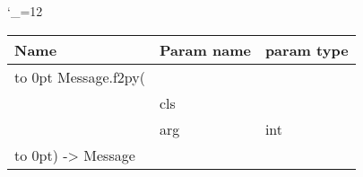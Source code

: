 \begingroup \catcode`\_=12 \tt
\begin{tabular}{lll}
\toprule
\textrm{Name}&\textrm{Param name}&\textrm{param type}\\
\midrule
\hbox to 0pt {Message.f2py(\hss}\\
& cls\\
& arg & int\\
\hbox to 0pt{) -> Message\hss}\\
\bottomrule
\end{tabular}
\endgroup
